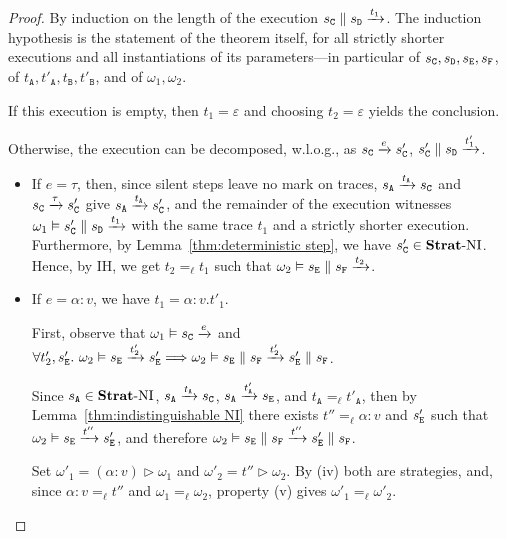 \documentclass[preprint,5p,twocolumn]{elsarticle}
\begin{document}
\begin{proof}
  By induction on the length of the execution $s_{\mathtt{C}} \parallel s_{\mathtt{D}} \xrightarrow{t_1}$. The induction
  hypothesis is the statement of the theorem itself, for all strictly shorter executions and all
  instantiations of its parameters---in particular of $s_{\mathtt{C}},s_{\mathtt{D}},s_{\mathtt{E}},s_{\mathtt{F}}$, of
  $t_{\mathtt{A}},t'_{\mathtt{A}},t_{\mathtt{B}},t'_{\mathtt{B}}$, and of $\omega_1,\omega_2$.

  If this execution is empty, then $t_1 = \varepsilon$ and choosing $t_2 = \varepsilon$
  yields the conclusion.

  Otherwise, the execution can be decomposed, w.l.o.g., as $s_{\mathtt{C}} \xrightarrow{e} s_{\mathtt{C}}'$, $s_{\mathtt{C}}' \parallel s_{\mathtt{D}} \xrightarrow{t_1'}$. 
  \begin{itemize}
  \item If $e = \tau$, then, since silent steps leave no mark on traces, $s_{\mathtt{A}} \xrightarrow{t_{\mathtt{A}}} s_{\mathtt{C}}$
    and $s_{\mathtt{C}} \xrightarrow{\tau} s_{\mathtt{C}}'$ give $s_{\mathtt{A}} \xrightarrow{t_{\mathtt{A}}} s_{\mathtt{C}}'$, and the remainder
    of the execution witnesses $\omega_1 \vDash s_{\mathtt{C}}' \parallel s_{\mathtt{D}} \xrightarrow{t_1}$ with the same
    trace $t_1$ and a strictly shorter execution. Furthermore, by
    Lemma~\ref{thm:deterministic step}, we have $s_{\mathtt{C}}' \in \mathbf{Strat}\text{-}\mathrm{NI}$.
    Hence, by IH, we get $t_2 =_\ell t_1$ such
    that $\omega_2 \vDash s_{\mathtt{E}} \parallel s_{\mathtt{F}} \xrightarrow{t_2}$.

  \item If $e = \alpha:v$, we have $t_1 = \alpha:v.t'_1$.

    First, observe that
    $\omega_1 \vDash s_{\mathtt{C}} \xrightarrow{e}$ and
    $\forall t'_2,s_{\mathtt{E}}'.~\omega_2 \vDash s_{\mathtt{E}} \xrightarrow{t_2'} s_{\mathtt{E}}' \Longrightarrow \omega_2 \vDash s_{\mathtt{E}} \parallel s_{\mathtt{F}} \xrightarrow{t_2'} s_{\mathtt{E}}' \parallel s_{\mathtt{F}}$.

    Since $s_{\mathtt{A}} \in \mathbf{Strat}\text{-}\mathrm{NI}$, $s_{\mathtt{A}} \xrightarrow{t_{\mathtt{A}}} s_{\mathtt{C}}$, $s_{\mathtt{A}} \xrightarrow{t'_{\mathtt{A}}} s_{\mathtt{E}}$,
    and $t_{\mathtt{A}} =_\ell t'_{\mathtt{A}}$, then by Lemma~\ref{thm:indistinguishable NI} there
    exists $t'' =_\ell \alpha:v$ and $s_{\mathtt{E}}'$ such that
    $\omega_2 \vDash s_{\mathtt{E}} \xrightarrow{t''} s_{\mathtt{E}}'$,  and therefore
    $\omega_2 \vDash s_{\mathtt{E}} \parallel s_{\mathtt{F}} \xrightarrow{t''} s_{\mathtt{E}}' \parallel s_{\mathtt{F}}$.

    Set $\omega'_1 = (\alpha\!:\!v) \triangleright \omega_1$ and $\omega'_2 = t'' \triangleright \omega_2$.
    By (iv) both are strategies, and, since $\alpha\!:\!v =_\ell t''$ and $\omega_1 =_\ell \omega_2$,
    property (v) gives $\omega'_1 =_\ell \omega'_2$.


\end{itemize}
\end{proof}
\end{document}
